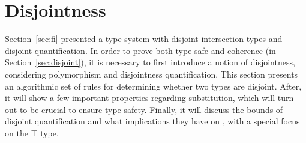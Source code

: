 \section{Disjointness} \label{sec:alg-dis}
Section~\ref{sec:fi} presented a type system with disjoint
intersection types and disjoint quantification. In order to prove 
both type-safe and coherence (in Section~\ref{sec:disjoint}), it is necessary to first introduce a
notion of disjointness, considering polymorphism and disjointness quantification.
This section presents an algorithmic set of rules for determining whether two types are disjoint. 
After, it will show a few important properties regarding substitution, which will turn out
to be crucial to ensure type-safety.
Finally, it will discuss the bounds of disjoint quantification and what implications
they have on \name, with a special focus on the $\top$ type. 

